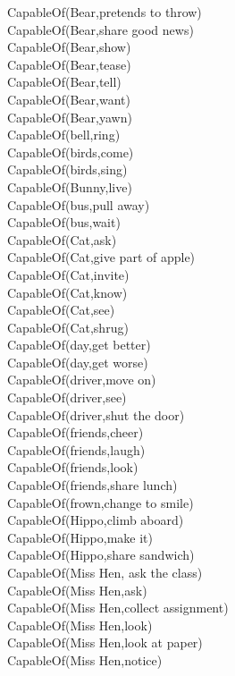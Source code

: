 \begin{multicols}{2}
\begin{footnotesize}
CapableOf(Bear,pretends to throw) \\
CapableOf(Bear,share good news) \\
CapableOf(Bear,show) \\
CapableOf(Bear,tease) \\
CapableOf(Bear,tell) \\
CapableOf(Bear,want) \\
CapableOf(Bear,yawn) \\
CapableOf(bell,ring) \\
CapableOf(birds,come) \\
CapableOf(birds,sing) \\
CapableOf(Bunny,live) \\
CapableOf(bus,pull away) \\
CapableOf(bus,wait) \\
CapableOf(Cat,ask) \\
CapableOf(Cat,give part of apple) \\
CapableOf(Cat,invite) \\
CapableOf(Cat,know) \\
CapableOf(Cat,see) \\
CapableOf(Cat,shrug) \\
CapableOf(day,get better) \\
CapableOf(day,get worse) \\
CapableOf(driver,move on) \\
CapableOf(driver,see) \\
CapableOf(driver,shut the door) \\
CapableOf(friends,cheer) \\
CapableOf(friends,laugh) \\
CapableOf(friends,look) \\
CapableOf(friends,share lunch) \\
CapableOf(frown,change to smile) \\
CapableOf(Hippo,climb aboard) \\
CapableOf(Hippo,make it) \\
CapableOf(Hippo,share sandwich) \\
CapableOf(Miss Hen, ask the class) \\
CapableOf(Miss Hen,ask) \\
CapableOf(Miss Hen,collect assignment) \\
CapableOf(Miss Hen,look) \\
CapableOf(Miss Hen,look at paper) \\
CapableOf(Miss Hen,notice) \\

\end{footnotesize}
\end{multicols}
